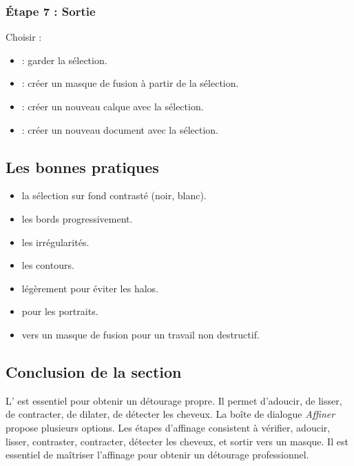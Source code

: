 \subsubsection{Étape 7 : Sortie}

Choisir  :
\begin{itemize}
    \item {} : garder la sélection.
    \item {} : créer un masque de fusion à partir de la sélection.
    \item {} : créer un nouveau calque avec la sélection.
    \item {} : créer un nouveau document avec la sélection.
\end{itemize}

\subsection{Les bonnes pratiques}

\begin{itemize}
    \item {} la sélection sur fond contrasté (noir, blanc).
    \item {} les bords progressivement.
    \item {} les irrégularités.
    \item {} les contours.
    \item {} légèrement pour éviter les halos.
    \item {} pour les portraits.
    \item {} vers un masque de fusion pour un travail non destructif.
\end{itemize}

\subsection*{Conclusion de la section}

L' est essentiel pour obtenir un détourage propre. Il permet d'adoucir, de lisser, de contracter, de dilater, de détecter les cheveux. La boîte de dialogue \emph{Affiner} propose plusieurs options. Les étapes d'affinage consistent à vérifier, adoucir, lisser, contraster, contracter, détecter les cheveux, et sortir vers un masque. Il est essentiel de maîtriser l'affinage pour obtenir un détourage professionnel.

